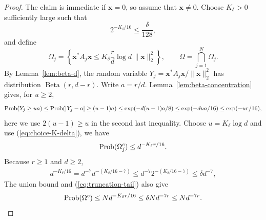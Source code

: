 \documentclass{article}
\renewcommand{\eqref}[1]{(\ref{#1})}
\newcommand{\Prob}{{\rm Prob}}
\newcommand{\vx}{{\mathbf x}}
\newcommand{\0}{{\mathbf 0}}
\numberwithin{equation}{section}
\begin{document}
	\begin{proof}
		The claim is immediate if $\vx=0$, so assume that $\vx\ne0$. Choose
		$K_\delta>0$ sufficiently large such that
		\begin{equation}\label{eq:choice-K-delta}
			2^{-K_\delta/16}\le\frac{\delta}{128},
		\end{equation}
		and define
		\[
		\Omega_j=
		\left\{\vx^*A_j\vx
		\le K_\delta\frac rd\log d\,\|\vx\|_2^2\right\},
		\qquad
		\Omega=\bigcap_{j=1}^N\Omega_j.
		\]
		By Lemma~\ref{lem:beta-d}, the random variable
		$Y_j=\vx^*A_j\vx/\|\vx\|_2^2$ has distribution
		$\operatorname{Beta}(r,d-r)$. Write $a=r/d$. Lemma~\ref{lem:beta-concentration} gives, for
		$u\ge 2$,
		\[
		\Prob(Y_j\ge ua)
		\le\Prob(|Y_j-a|\ge (u-1)a)\le\exp(-d(u-1)a/8) \le\exp(-dua/16)\le\exp(-ur/16),%
		\]
		here we use $2(u-1)\ge u$ in the second last inequality. Choose $u=K_\delta\log d$ and use \eqref{eq:choice-K-delta}, we have
		\begin{equation}\label{eq:truncation-tail}
			\Prob(\Omega_j^c)\le d^{-K_\delta r/16}.
		\end{equation}
		Because $r\ge1$ and $d\ge2$,
		\begin{align*}
			d^{-K_\delta/16}=d^{-7}d^{-(K_\delta/16-7)}
			\le d^{-7}2^{-(K_\delta/16-7)}
			\le\delta d^{-7},
		\end{align*}
		The union bound and \eqref{eq:truncation-tail} also give
		\begin{equation}\label{eq:truncation-event}
			\Prob(\Omega^c)
			\le Nd^{-K_\delta r/16}
			\le \delta Nd^{-7r}\le Nd^{-7r}.
		\end{equation}
		

\end{proof}
\end{document}
